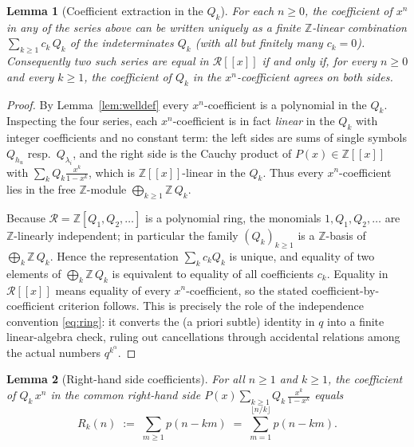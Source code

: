 \documentclass[12pt]{article}
\newtheorem{lemma}{Lemma}
\theoremstyle{definition}
\begin{document}
\begin{lemma}[Coefficient extraction in the $Q_k$]\label{lem:indep}
For each $n\ge0$, the coefficient of $x^n$ in any of the series above can be written
uniquely as a finite $\mathbb Z$-linear combination
\(\sum_{k\ge1} c_k\,Q_k\) of the indeterminates $Q_k$ \emph{(}with all but finitely
many $c_k=0$\emph{)}. Consequently two such series are equal in $\mathcal R[[x]]$ if
and only if, for every $n\ge0$ and every $k\ge1$, the coefficient of $Q_k$ in the
$x^n$-coefficient agrees on both sides.
\end{lemma}

\begin{proof}
By Lemma~\ref{lem:welldef} every $x^n$-coefficient is a polynomial in the $Q_k$.
Inspecting the four series, each $x^n$-coefficient is in fact \emph{linear} in the
$Q_k$ with integer coefficients and no constant term: the left sides are sums of
single symbols $Q_{h_u}$ resp.\ $Q_{\lambda_i}$, and the right side is the Cauchy
product of $P(x)\in\mathbb Z[[x]]$ with $\sum_k Q_k\frac{x^k}{1-x^k}$, which is
$\mathbb Z[[x]]$-linear in the $Q_k$. Thus every $x^n$-coefficient lies in the free
$\mathbb Z$-module $\bigoplus_{k\ge1}\mathbb Z\,Q_k$.

Because $\mathcal R=\mathbb Z[Q_1,Q_2,\dots]$ is a polynomial ring, the monomials
$1,Q_1,Q_2,\dots$ are $\mathbb Z$-linearly independent; in particular the family
$(Q_k)_{k\ge1}$ is a $\mathbb Z$-basis of $\bigoplus_k\mathbb Z\,Q_k$. Hence the
representation $\sum_k c_kQ_k$ is unique, and equality of two elements of
$\bigoplus_k\mathbb Z\,Q_k$ is equivalent to equality of all coefficients $c_k$.
Equality in $\mathcal R[[x]]$ means equality of every $x^n$-coefficient, so the
stated coefficient-by-coefficient criterion follows. This is precisely the role of
the independence convention \eqref{eq:ring}: it converts the (a priori subtle)
identity in $q$ into a finite linear-algebra check, ruling out cancellations through
accidental relations among the actual numbers $q^{k^\alpha}$.
\end{proof}

\begin{lemma}[Right-hand side coefficients]\label{lem:rhs}
For all $n\ge1$ and $k\ge1$, the coefficient of $Q_k\,x^n$ in the common right-hand
side $\displaystyle P(x)\sum_{k\ge1}Q_k\,\frac{x^k}{1-x^k}$ equals
\begin{equation}\label{eq:Rk}
R_k(n)\;:=\;\sum_{m\ge1}p(n-km)\;=\;\sum_{m=1}^{\lfloor n/k\rfloor}p(n-km).
\end{equation}
\end{lemma}
\end{document}
